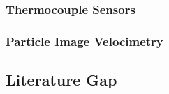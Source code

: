 \subsubsection{Thermocouple Sensors}
\subsubsection{Particle Image Velocimetry}

\subsection{Literature Gap}

\pagebreak



